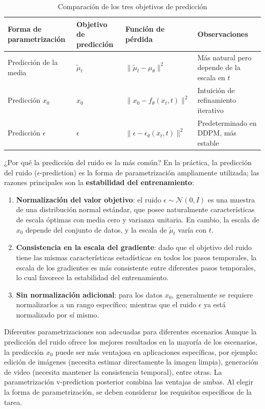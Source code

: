 \documentclass[a4paper]{article}
\begin{document}
\begin{table}[H]
\centering
\caption{Comparación de los tres objetivos de predicción}
\begin{tabular}{llll}
\toprule
\textbf{Forma de parametrización} & \textbf{Objetivo de predicción} & \textbf{Función de pérdida} & \textbf{Observaciones} \\
\midrule
Predicción de la media & $\tilde{\mu}_t$ & $\|\tilde{\mu}_t - \mu_\theta\|^2$ & Más natural pero depende de la escala en $t$ \\
Predicción $x_0$ & $x_0$ & $\|x_0 - f_\theta(x_t,t)\|^2$ & Intuición de refinamiento iterativo \\
Predicción $\epsilon$ & $\epsilon$ & $\|\epsilon - \epsilon_\theta(x_t,t)\|^2$ & Predeterminado en DDPM, más estable \\
\bottomrule
\end{tabular}
\end{table}

\begin{importantbox}{¿Por qué la predicción del ruido es la más común?}
En la práctica, la predicción del ruido ($\epsilon$-prediction) es la forma de parametrización ampliamente utilizada; las razones principales son la \textbf{estabilidad del entrenamiento}:
\begin{enumerate}
    \item \textbf{Normalización del valor objetivo}: el ruido $\epsilon \sim \mathcal{N}(0,I)$ es una muestra de una distribución normal estándar, que posee naturalmente características de escala óptimas con media cero y varianza unitaria. En cambio, la escala de $x_0$ depende del conjunto de datos, y la escala de $\tilde{\mu}_t$ varía con $t$.
    \item \textbf{Consistencia en la escala del gradiente}: dado que el objetivo del ruido tiene las mismas características estadísticas en todos los pasos temporales, la escala de los gradientes es más consistente entre diferentes pasos temporales, lo cual favorece la estabilidad del entrenamiento.
    \item \textbf{Sin normalización adicional}: para los datos $x_0$, generalmente se requiere normalizarlos a un rango específico; mientras que el ruido $\epsilon$ ya está normalizado por sí mismo.
\end{enumerate}
\end{importantbox}

\begin{warningbox}{Diferentes parametrizaciones son adecuadas para diferentes escenarios}
Aunque la predicción del ruido ofrece los mejores resultados en la mayoría de los escenarios, la predicción $x_0$ puede ser más ventajosa en aplicaciones específicas, por ejemplo: edición de imágenes (necesita estimar directamente la imagen limpia), generación de video (necesita mantener la consistencia temporal), entre otras. La parametrización v-prediction posterior combina las ventajas de ambas. Al elegir la forma de parametrización, se deben considerar los requisitos específicos de la tarea.
\end{warningbox}
\end{document}
